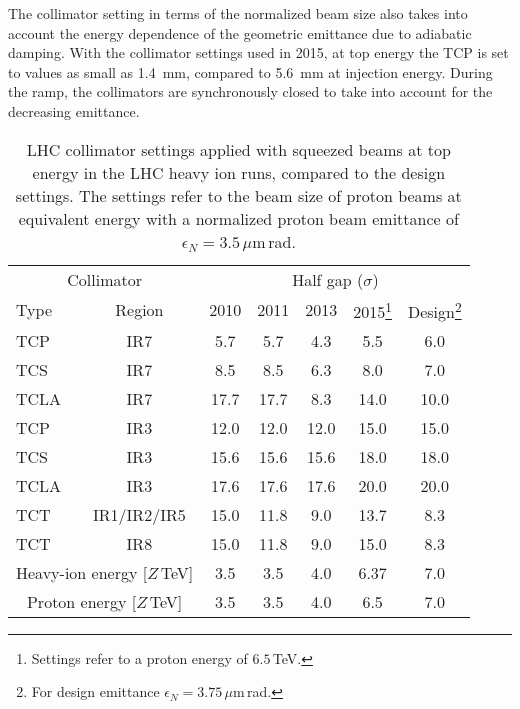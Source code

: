 The collimator setting in terms of the normalized beam size also takes into account the energy dependence of the geometric emittance due to adiabatic damping. With the collimator settings used in 2015, at top energy the TCP is set to values as small as 1.4~mm, compared to 5.6~mm at injection energy. During the ramp, the collimators are synchronously closed to take into account for the decreasing emittance. 
%
\begin{table}[b]
\caption{LHC collimator settings applied with squeezed beams at top energy in the LHC heavy ion runs, compared to the design settings. The settings refer to the beam size of proton beams at equivalent energy with a normalized proton beam emittance of $\epsilon_N = 3.5\,\mu$m$\,$rad. }
%
\small
\begin{center}
\begin{minipage}{10cm}
\begin{tabular}{lcccccc}
\toprule
\midrule
 \multicolumn{2}{c}{Collimator} & \multicolumn{5}{c}{Half gap ($\sigma$)} \\
Type & Region & 2010 & 2011 & 2013 & 2015\footnote{Settings refer to a proton energy of $6.5\,$TeV.} & Design\footnote{For design emittance $\epsilon_N=3.75\,\mu$m$\,$rad.} \\ \midrule
TCP  & IR7 & 5.7  & 5.7  & 4.3     & 5.5  & 6.0  \\
TCS  & IR7 & 8.5  & 8.5  & 6.3     & 8.0  & 7.0  \\
TCLA & IR7 & 17.7 & 17.7 & 8.3     & 14.0 & 10.0 \\ \midrule
TCP  & IR3 & 12.0 & 12.0 & 12.0    & 15.0 & 15.0 \\
TCS  & IR3 & 15.6 & 15.6 & 15.6    & 18.0 & 18.0 \\
TCLA & IR3 & 17.6 & 17.6 & 17.6    & 20.0 & 20.0 \\ \midrule
TCT  & IR1/IR2/IR5        & 15.0 & 11.8 &  9.0 & 13.7& 8.3  \\         
TCT  & IR8                & 15.0 & 11.8 &  9.0 & 15.0& 8.3  \\ \midrule \midrule
\multicolumn{2}{c}{Heavy-ion energy [$Z\,$TeV]} & 3.5 & 3.5 & 4.0 & 6.37& 7.0 \\
\multicolumn{2}{c}{Proton energy [$Z\,$TeV]} & 3.5 & 3.5 & 4.0 & 6.5& 7.0 \\
\bottomrule
\end{tabular}
\end{minipage}
\end{center}
\label{tab:14070901}
\end{table}

